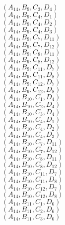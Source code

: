 \documentclass[14pt]{article}
\begin{document}
    $({A}_{14}, {B}_{9}, {C}_{3}, {D}_{4}) $ \\ 
    $({A}_{14}, {B}_{9}, {C}_{4}, {D}_{1}) $ \\ 
    $({A}_{14}, {B}_{9}, {C}_{4}, {D}_{2}) $ \\ 
    $({A}_{14}, {B}_{9}, {C}_{4}, {D}_{3}) $ \\ 
    $({A}_{14}, {B}_{9}, {C}_{7}, {D}_{11}) $ \\ 
    $({A}_{14}, {B}_{9}, {C}_{7}, {D}_{12}) $ \\ 
    $({A}_{14}, {B}_{9}, {C}_{8}, {D}_{11}) $ \\ 
    $({A}_{14}, {B}_{9}, {C}_{8}, {D}_{12}) $ \\ 
    $({A}_{14}, {B}_{9}, {C}_{11}, {D}_{7}) $ \\ 
    $({A}_{14}, {B}_{9}, {C}_{11}, {D}_{8}) $ \\ 
    $({A}_{14}, {B}_{9}, {C}_{12}, {D}_{7}) $ \\ 
    $({A}_{14}, {B}_{9}, {C}_{12}, {D}_{8}) $ \\ 
    $({A}_{14}, {B}_{10}, {C}_{1}, {D}_{4}) $ \\ 
    $({A}_{14}, {B}_{10}, {C}_{2}, {D}_{4}) $ \\ 
    $({A}_{14}, {B}_{10}, {C}_{3}, {D}_{4}) $ \\ 
    $({A}_{14}, {B}_{10}, {C}_{4}, {D}_{1}) $ \\ 
    $({A}_{14}, {B}_{10}, {C}_{4}, {D}_{2}) $ \\ 
    $({A}_{14}, {B}_{10}, {C}_{4}, {D}_{3}) $ \\ 
    $({A}_{14}, {B}_{10}, {C}_{7}, {D}_{11}) $ \\ 
    $({A}_{14}, {B}_{10}, {C}_{7}, {D}_{12}) $ \\ 
    $({A}_{14}, {B}_{10}, {C}_{8}, {D}_{11}) $ \\ 
    $({A}_{14}, {B}_{10}, {C}_{8}, {D}_{12}) $ \\ 
    $({A}_{14}, {B}_{10}, {C}_{11}, {D}_{7}) $ \\ 
    $({A}_{14}, {B}_{10}, {C}_{11}, {D}_{8}) $ \\ 
    $({A}_{14}, {B}_{10}, {C}_{12}, {D}_{7}) $ \\ 
    $({A}_{14}, {B}_{10}, {C}_{12}, {D}_{8}) $ \\ 
    $({A}_{14}, {B}_{11}, {C}_{1}, {D}_{6}) $ \\ 
    $({A}_{14}, {B}_{11}, {C}_{2}, {D}_{6}) $ \\ 
    $({A}_{14}, {B}_{11}, {C}_{3}, {D}_{6}) $ \\ 
\end{document}
